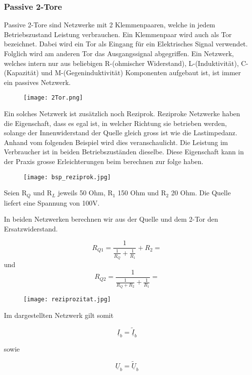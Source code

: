  \subsubsection{Passive 2-Tore} \label{subsubsec:2tore}
  
Passive 2-Tore sind Netzwerke mit 2 Klemmenpaaren, welche in jedem Betriebszustand Leistung verbrauchen. Ein Klemmenpaar wird auch als Tor bezeichnet. Dabei wird ein Tor als Eingang für ein Elektrisches Signal verwendet. Folglich wird am anderen Tor das Ausgangssignal abgegriffen. Ein Netzwerk, welches intern nur aus beliebigen R-(ohmischer Widerstand), L-(Induktivität), C-(Kapazität) und M-(Gegeninduktivität) Komponenten aufgebaut ist, ist immer ein passives Netzwerk. 

\begin{figure}[H]
	\centering
	\texttt{[image: 2Tor.png]}
	\label{fig:2tor}
\end{figure}

Ein solches Netzwerk ist zusätzlich noch Reziprok. Reziproke Netzwerke haben die Eigenschaft, dass es egal ist, in welcher Richtung sie betrieben werden, solange der Innenwiderstand der Quelle gleich gross ist wie die Lastimpedanz. Anhand vom folgenden Beispiel wird dies veranschaulicht. Die Leistung im Verbraucher ist in beiden Betriebszuständen dieselbe. Diese Eigenschaft kann in der Praxis grosse Erleichterungen beim berechnen zur folge haben.

\begin{figure}[H]
	\centering
	\texttt{[image: bsp\_reziprok.jpg]}
	\label{fig:reziprozitat}
\end{figure}


Seien R$_Q$ und R$_L$ jeweils 50 Ohm, R$_1$ 150 Ohm und R$_2$ 20 Ohm. Die Quelle liefert eine Spannung von 100V.

In beiden Netzwerken berechnen wir aus der Quelle und dem 2-Tor den Ersatzwiderstand.


\begin{equation}\label{equ:rqe1}
			R_{Q1} = \frac{1}{\frac{1}{R_Q}+\frac{1}{R_1}} +R_2 =  
		\end{equation}
und 
\begin{equation}\label{equ:rqe1}
			R_{Q2} = \frac{1}{\frac{1}{R_Q+R_2}+\frac{1}{R_1}} =  
		\end{equation}
		


\begin{figure}[H]
	\centering
	\texttt{[image: reziprozitat.jpg]}
	\label{fig:reziprozitat}
\end{figure}

Im dargestellten Netzwerk gilt somit

\begin{equation}\label{equ:verticImpedance}
			\underline{I}_b =  \underline{\tilde{I}}_b
		\end{equation}
		
sowie 		
		
\begin{equation}\label{equ:verticImpedance}
			\underline{U}_b =  \underline{\widetilde{U}}_b
		\end{equation}

\newpage


